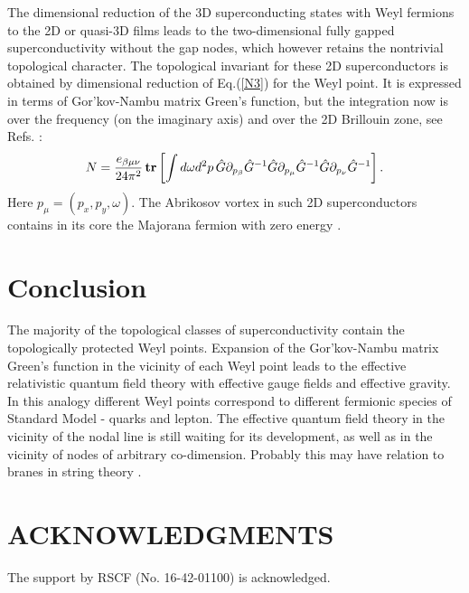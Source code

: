 \documentclass[prb,
superscriptaddress,showpacs,amsmath,amssymb]{revtex4}
\begin{document}
The  dimensional reduction of the 3D superconducting states with Weyl fermions to the 2D or quasi-3D 
films leads to the two-dimensional fully gapped superconductivity without the gap nodes, which however retains the nontrivial topological character. The topological invariant for these 2D superconductors is obtained by dimensional reduction of Eq.(\ref{N3}) for the Weyl point. It is expressed in terms of Gor'kov-Nambu matrix Green's function, but the integration now is over the frequency (on the imaginary axis) and over the 2D Brillouin zone,
see Refs. \cite{So1985,IshikawaMatsuyama1986,IshikawaMatsuyama1987,Volovik1988b}:
\begin{equation}
N= \frac{e_{\beta\mu\nu}}{24\pi^2} \,
{\bf tr}\left[ \int d\omega d^2p\,
 \hat G\partial_{p_\beta}  \hat G^{-1}
 \hat G\partial_{p_\mu}  \hat G^{-1}  \hat G\partial_{p_\nu}   \hat G^{-1}\right].
\label{2D}
\end{equation}
Here $p_\mu=(p_x,p_y,\omega)$.
The  Abrikosov vortex in such 2D superconductors contains in its core the Majorana fermion with zero energy \cite{Volovik1999,ReadGreen2000,Ivanov2001}.




  \section{Conclusion}

 The majority of the topological classes of superconductivity contain the topologically protected Weyl points.
Expansion of the Gor'kov-Nambu matrix Green's function in the vicinity of each Weyl point leads to the effective relativistic quantum field theory with effective gauge fields and effective gravity. In this analogy different Weyl points correspond to different fermionic species of Standard Model - quarks and lepton.  The effective quantum field theory in the vicinity of the nodal line
is still waiting for its development, as well as in the vicinity of nodes of arbitrary co-dimension. Probably this may have relation to branes in string theory \cite{Horava2005}.


\section*{\hspace*{-4.5mm}ACKNOWLEDGMENTS}
 The support by RSCF (No. 16-42-01100) is acknowledged.
 
\end{document}

